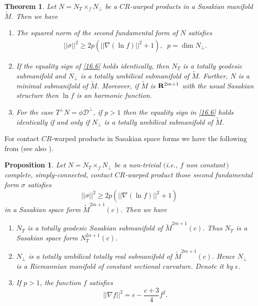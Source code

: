 \documentclass{amsart}
\theoremstyle{plain}
\newtheorem{theorem}{Theorem}[section]
\newtheorem{proposition}{Proposition}[section]
\numberwithin{equation}{section}
\theoremstyle{remark}
\numberwithin{equation}{section}
\begin{document}
\begin{theorem}\label{T:16.2} Let  $N=N_{T}\times_{f} N_{\perp}$ be a $CR$-warped products in a Sasakian manifold $\tilde M$. Then we have
\begin{enumerate}

\item The squared norm of the second fundamental form of $N$ satisfies
\begin{align} \label{16.6} ||\sigma||^{2}\geq 2p (||\nabla(\ln f)||^{2}+1),\;\; p= \dim N_{\perp}.\end{align}

\item If the equality sign of \eqref{16.6} holds identically, then $N_{T}$ is a totally geodesic submanifold and $N_{\perp}$ is a totally umbilical submanifold of $\tilde M$. Further, $N$ is a minimal submanifold of $\tilde M$.
Moreover, if $\tilde M$ is ${\bf R}^{2m+1}$ with the usual Sasakian structure then $\ln f$ is an harmonic function.

\item For the case $T^{\perp}N=\phi {\mathcal D}^{\perp}$,  if $p>1$ then the equality sign in \eqref{16.6} holds identically if and only if $N_{\perp}$ is a totally umbilical submanifold of $\tilde M$.
 \end{enumerate}\end{theorem}

For contact $CR$-warped products in Sasakian space forms we have the following from \cite{Mu05} (see also \cite{HM03}).

\begin{proposition} Let  $N=N_{T}\times_{f} N_{\perp}$ be a non-trivial $($i.e., $f$ non constant$\,)$ complete, simply-connected, contact $CR$-warped product those second fundamental form $\sigma$ satisfies 
$$||\sigma||^{2}\geq 2p (||\nabla(\ln f)||^{2}+1)$$ in a Sasakian space form $\tilde M^{2m+1}(c)$. Then we have

\begin{enumerate}
\item $N_{T}$ is a totally geodesic Sasakian submanifold of $\tilde M^{2m+1}(c)$.  Thus $N_{T}$ is a Sasakian space form $N_{T}^{2\alpha+1}(c)$.

\item $N_{\perp}$ is a totally umbilical totally real submanifold of $\tilde M^{2m+1}(c)$. Hence $N_{\perp}$ is a Riemannian manifold of constant sectional curvature. Denote it by $\epsilon$.

\item If $p>1$,  the function $f$ satisfies 
$$||\nabla f||^{2}=\epsilon -\frac{c+3}{4}f^{2}.$$
\end{enumerate}\end{proposition}
\end{document}
